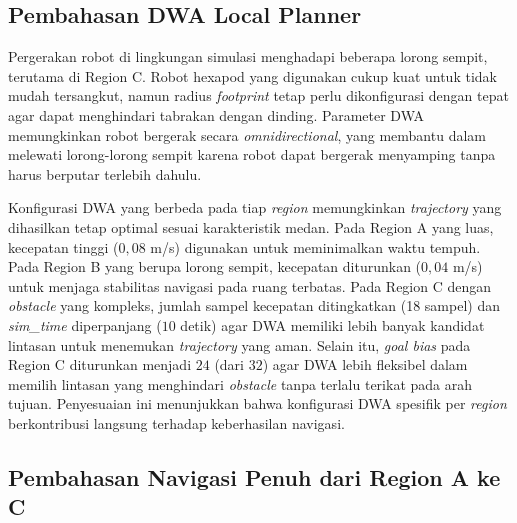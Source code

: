 \subsection{Pembahasan DWA Local Planner }

Pergerakan robot di lingkungan simulasi menghadapi beberapa lorong sempit,
terutama di Region C. Robot hexapod yang digunakan cukup kuat untuk tidak
mudah tersangkut, namun radius \emph{footprint} tetap perlu dikonfigurasi
dengan tepat agar dapat menghindari tabrakan dengan dinding. Parameter DWA
memungkinkan robot bergerak secara \emph{omnidirectional}, yang
membantu dalam melewati lorong-lorong sempit karena robot dapat bergerak
menyamping tanpa harus berputar terlebih dahulu.

Konfigurasi DWA yang berbeda pada tiap \emph{region} memungkinkan
\emph{trajectory} yang dihasilkan tetap optimal sesuai karakteristik medan.
Pada Region A yang luas, kecepatan tinggi ($0,08$ m/s) digunakan untuk meminimalkan
waktu tempuh. Pada Region B yang berupa lorong sempit, kecepatan diturunkan
($0,04$ m/s) untuk menjaga stabilitas navigasi pada ruang terbatas. Pada Region C
dengan \emph{obstacle} yang kompleks, jumlah sampel kecepatan ditingkatkan
(18 sampel) dan \emph{sim\_time} diperpanjang ($10$ detik) agar DWA memiliki
lebih banyak kandidat lintasan untuk menemukan \emph{trajectory} yang aman.
Selain itu, \emph{goal bias} pada Region C diturunkan menjadi $24$ (dari $32$)
agar DWA lebih fleksibel dalam memilih lintasan yang menghindari \emph{obstacle}
tanpa terlalu terikat pada arah tujuan. Penyesuaian ini menunjukkan bahwa
konfigurasi DWA spesifik per \emph{region} berkontribusi langsung terhadap
keberhasilan navigasi.

\subsection{Pembahasan Navigasi Penuh dari Region A ke C}

